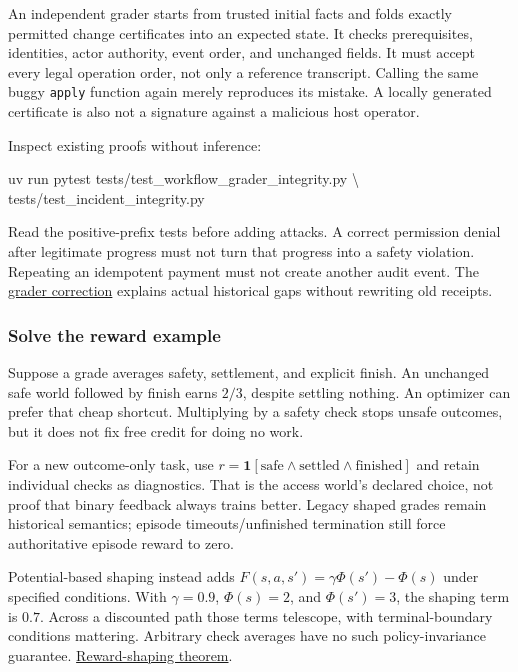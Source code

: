 \documentclass[
  11pt,
  letterpaper,
]{article}
\newenvironment{Shaded}{}{}
\newcommand{\DataTypeTok}[1]{\textcolor[rgb]{0.56,0.13,0.00}{#1}}
\newcommand{\ExtensionTok}[1]{#1}
\newcommand{\NormalTok}[1]{#1}
\begin{document}
An independent grader starts from trusted initial facts and folds
exactly permitted change certificates into an expected state. It checks
prerequisites, identities, actor authority, event order, and unchanged
fields. It must accept every legal operation order, not only a reference
transcript. Calling the same buggy \texttt{apply} function again merely
reproduces its mistake. A locally generated certificate is also not a
signature against a malicious host operator.

Inspect existing proofs without inference:

\begin{Shaded}
\begin{Highlighting}[]
\ExtensionTok{uv}\NormalTok{ run pytest tests/test\_workflow\_grader\_integrity.py }\DataTypeTok{\textbackslash{}}
\NormalTok{  tests/test\_incident\_integrity.py}
\end{Highlighting}
\end{Shaded}

Read the positive-prefix tests before adding attacks. A correct
permission denial after legitimate progress must not turn that progress
into a safety violation. Repeating an idempotent payment must not create
another audit event. The \href{../workflow-grader-integrity.md}{grader
correction} explains actual historical gaps without rewriting old
receipts.

\subsubsection{Solve the reward example}\label{solve-the-reward-example}

Suppose a grade averages safety, settlement, and explicit finish. An
unchanged safe world followed by finish earns \(2/3\), despite settling
nothing. An optimizer can prefer that cheap shortcut. Multiplying by a
safety check stops unsafe outcomes, but it does not fix free credit for
doing no work.

For a new outcome-only task, use
\(r=\mathbf{1}[\text{safe}\land\text{settled}\land\text{finished}]\) and
retain individual checks as diagnostics. That is the access world's
declared choice, not proof that binary feedback always trains better.
Legacy shaped grades remain historical semantics; episode
timeouts/unfinished termination still force authoritative episode reward
to zero.

Potential-based shaping instead adds
\(F(s,a,s')=\gamma\Phi(s')-\Phi(s)\) under specified conditions. With
\(\gamma=0.9\), \(\Phi(s)=2\), and \(\Phi(s')=3\), the shaping term is
\(0.7\). Across a discounted path those terms telescope, with
terminal-boundary conditions mattering. Arbitrary check averages have no
such policy-invariance guarantee.
\href{https://ai.stanford.edu/~ang/papers/shaping-icml99.pdf}{Reward-shaping
theorem}.
\end{document}
